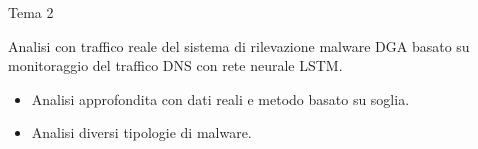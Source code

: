 

\begin{frame}{Tema 2}
  \vfill

  Analisi con traffico reale del sistema di rilevazione malware DGA basato su monitoraggio del traffico DNS con rete neurale LSTM.

  \vfill

  \begin{itemize}
    \item Analisi approfondita con dati reali e metodo basato su soglia.
    \item Analisi diversi tipologie di malware.
  \end{itemize}

  \vfill



    
    

\end{frame}

